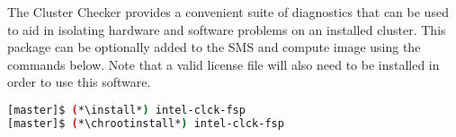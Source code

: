 The \Intel{} Cluster Checker provides a convenient suite of diagnostics that
can be used to aid in isolating hardware and software problems on an installed
cluster. This package can be optionally added to the SMS and compute image
using the commands below. Note that a valid license file will also need to be
installed in order to use this software.

\begin{lstlisting}[language=bash,keywords={}]
[master]$ (*\install*) intel-clck-fsp
[master]$ (*\chrootinstall*) intel-clck-fsp
\end{lstlisting}
